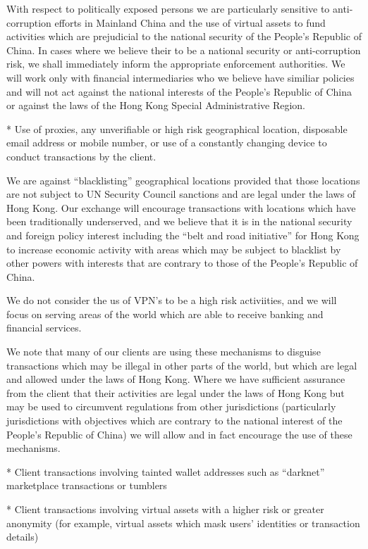 With respect to politically exposed persons we are particularly
sensitive to anti-corruption efforts in Mainland China and the use of
virtual assets to fund activities which are prejudicial to the
national security of the People's Republic of China.  In cases where
we believe their to be a national security or anti-corruption risk, we
shall immediately inform the appropriate enforcement authorities.  We
will work only with financial intermediaries who we believe have
similiar policies and will not act against the national interests of
the People's Republic of China or against the laws of the Hong Kong
Special Administrative Region.

* Use of proxies, any unverifiable or high risk geographical location,
disposable email address or mobile number, or use of a constantly
changing device to conduct transactions by the client.

We are against ``blacklisting'' geographical locations provided that
those locations are not subject to UN Security Council sanctions and
are legal under the laws of Hong Kong.  Our exchange will encourage
transactions with locations which have been traditionally underserved,
and we believe that it is in the national security and foreign policy
interest including the ``belt and road initiative'' for Hong Kong to
increase economic activity with areas which may be subject to
blacklist by other powers with interests that are contrary to those of
the People's Republic of China.

We do not consider the us of VPN's to be a high risk activiities, and
we will focus on serving areas of the world which are able to receive
banking and financial services.

We note that many of our clients are using these mechanisms to
disguise transactions which may be illegal in other parts of the
world, but which are legal and allowed under the laws of Hong Kong.
Where we have sufficient assurance from the client that their
activities are legal under the laws of Hong Kong but may be used to
circumvent regulations from other jurisdictions (particularly
jurisdictions with objectives which are contrary to the national
interest of the People's Republic of China) we will allow and in fact
encourage the use of these mechanisms.

* Client transactions involving tainted wallet addresses such as
“darknet” marketplace transactions or tumblers

* Client transactions involving virtual assets with a higher risk or
greater anonymity (for example, virtual assets which mask users’
identities or transaction details)

